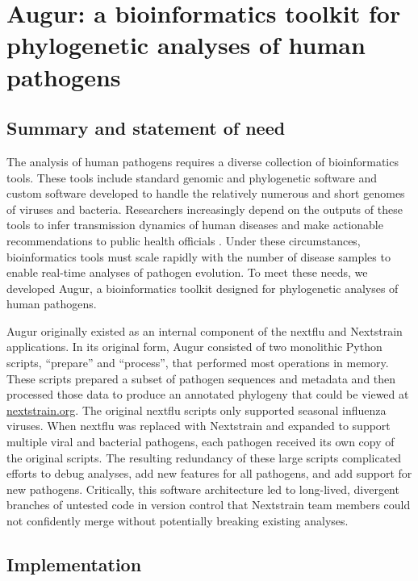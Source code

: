 \chapter{Augur: a bioinformatics toolkit for phylogenetic analyses of human pathogens}

\section{Summary and statement of need}

The analysis of human pathogens requires a diverse collection of bioinformatics tools.
These tools include standard genomic and phylogenetic software and custom software developed to handle the relatively numerous and short genomes of viruses and bacteria.
Researchers increasingly depend on the outputs of these tools to infer transmission dynamics of human diseases and make actionable recommendations to public health officials \citep{Black2020,Bedford2020}.
Under these circumstances, bioinformatics tools must scale rapidly with the number of disease samples to enable real-time analyses of pathogen evolution.
To meet these needs, we developed Augur, a bioinformatics toolkit designed for phylogenetic analyses of human pathogens.

Augur originally existed as an internal component of the nextflu \citep{Neher:2015jr} and Nextstrain \citep{Hadfield2018} applications.
In its original form, Augur consisted of two monolithic Python scripts, ``prepare'' and ``process'', that performed most operations in memory.
These scripts prepared a subset of pathogen sequences and metadata and then processed those data to produce an annotated phylogeny that could be viewed at \url{nextstrain.org}.
The original nextflu scripts only supported seasonal influenza viruses.
When nextflu was replaced with Nextstrain and expanded to support multiple viral and bacterial pathogens, each pathogen received its own copy of the original scripts.
The resulting redundancy of these large scripts complicated efforts to debug analyses, add new features for all pathogens, and add support for new pathogens.
Critically, this software architecture led to long-lived, divergent branches of untested code in version control that Nextstrain team members could not confidently merge without potentially breaking existing analyses.

\section{Implementation}

